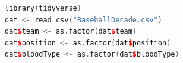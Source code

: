 \begin{lstlisting}[language=c++,label={code:05_exe1},caption={データの読み込みと整え}]
library(tidyverse)
dat <- read_csv("BaseballDecade.csv")
dat$team <- as.factor(dat$team)
dat$position <- as.factor(dat$position)
dat$bloodType <- as.factor(dat$bloodType)
\end{lstlisting}
